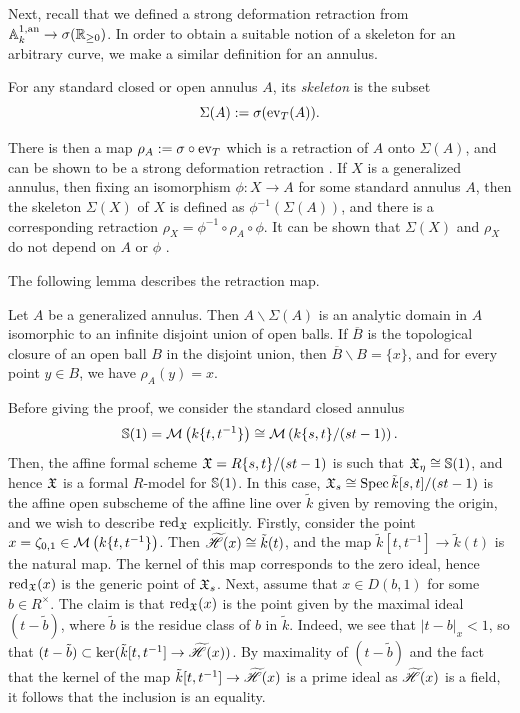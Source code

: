 Next, recall that we defined a strong deformation retraction from $\mathbb{A}^{1, \text{an}}_{k} \to \sigma(\mathbb{R}_{\geq 0})$.
In order to obtain a suitable notion of a skeleton for an arbitrary curve, we make a similar definition for an annulus.

\begin{defn}\parencite[\S 2.3]{bpr}
    For any standard closed or open annulus $A$, its \textit{skeleton} is the subset \[\Sigma(A) := \sigma(\operatorname{ev}_{T}(A)). \]
\end{defn}

There is then a map $\rho_A := \sigma \circ \operatorname{ev}_{T}$ which is a retraction of $A$ onto $\Sigma(A)$, and can be shown to be a strong deformation retraction \parencite[Proposition 4.1.6]{berk1}.
If $X$ is a generalized annulus, then fixing an isomorphism $\phi: X \to A$ for some standard annulus $A$, then the skeleton $\Sigma(X)$ of $X$ is defined as $\phi^{-1}(\Sigma(A))$, and there is a corresponding retraction $\rho_X = \phi^{-1} \circ \rho_A \circ \phi$.
It can be shown that $\Sigma(X)$ and $\rho_X$ do not depend on $A$ or $\phi$ \parencite[Corollary 2.6]{bpr}.

The following lemma describes the retraction map.

\begin{lemma} \label{annulusretract} \parencite[Lemma 2.12]{bpr}
    Let $A$ be a generalized annulus. 
    Then $A \backslash \Sigma(A)$ is an analytic domain in $A$ isomorphic to an infinite disjoint union of open balls.
    If $\overline{B}$ is the topological closure of an open ball $B$ in the disjoint union, then $\overline{B} \backslash B = \{ x \}$, and for every point $y \in B$, we have $\rho_{A}(y) = x$.
\end{lemma}

Before giving the proof, we consider the standard closed annulus \[\mathbb{S}(1) = \mathcal{M}\left(k\{t, t^{-1}\}\right) \cong \mathcal{M}\left(k\{s, t\}/(s t - 1)\right).\]
Then, the affine formal scheme $\mathfrak{X} = R\{s, t\}/(st - 1)$ is such that $\mathfrak{X}_{\eta} \cong \mathbb{S}(1)$, and hence $\mathfrak{X}$ is a formal $R$-model for $\mathbb{S}(1)$.
In this case, $\mathfrak{X}_s \cong \operatorname{Spec} \tilde{k}[s, t]/(st - 1)$ is the affine open subscheme of the affine line over $\tilde{k}$ given by removing the origin, and we wish to describe $\operatorname{red}_{\mathfrak{X}}$ explicitly.
Firstly, consider the point $x = \zeta_{0, 1} \in \mathcal{M}\left(k\{t, t^{-1}\}\right)$.
Then $\widetilde{\mathscr{H}}(x) \cong \tilde{k}(t)$, and the map $\tilde{k}[t, t^{-1}] \to \tilde{k}(t)$ is the natural map.
The kernel of this map corresponds to the zero ideal, hence $\operatorname{red}_{\mathfrak{X}}(x)$ is the generic point of $\mathfrak{X}_s$.
Next, assume that $x \in D(b, 1)$ for some $b \in R^{\times}$.
The claim is that $\operatorname{red}_{\mathfrak{X}}(x)$ is the point given by the maximal ideal $(t - \tilde{b})$, where $\tilde{b}$ is the residue class of $b$ in $\tilde{k}$.
Indeed, we see that $|t - b|_x < 1$, so that $(t - \tilde{b}) \subset \ker (\tilde{k}[t, t^{-1}] \to \widetilde{\mathscr{H}}(x))$.
By maximality of $(t - \tilde{b})$ and the fact that the kernel of the map $\tilde{k}[t, t^{-1}] \to \widetilde{\mathscr{H}}(x)$ is a prime ideal as $\widetilde{\mathscr{H}}(x)$ is a field, it follows that the inclusion is an equality.

